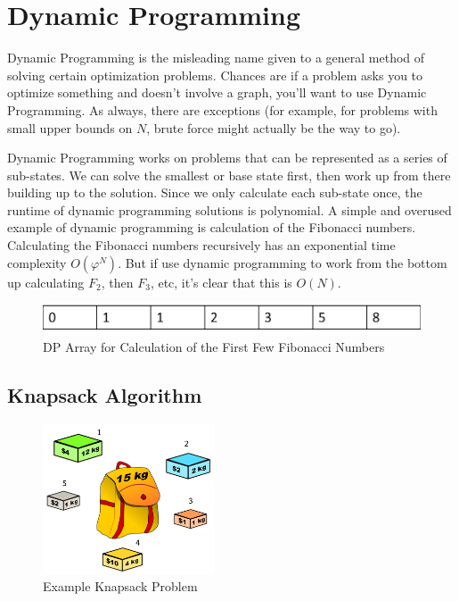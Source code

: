\chapter{Dynamic Programming}

Dynamic Programming is the misleading name given to a general method of solving certain optimization problems.  Chances are if a problem asks you to optimize something and doesn't involve a graph, you'll want to use Dynamic Programming.  As always, there are exceptions  (for example, for problems with small upper bounds on $N$, brute force might actually be the way to go).

Dynamic Programming works on problems that can be represented as a series of sub-states.  We can solve the smallest or base state first, then work up from there building up to the solution.  Since we only calculate each sub-state once, the runtime of dynamic programming solutions is polynomial.
%
A simple and overused example of dynamic programming is calculation of the Fibonacci numbers.  Calculating the Fibonacci numbers recursively has an exponential time complexity $O(\varphi^N)$.  But if use dynamic programming to work from the bottom up calculating $F_2$, then $F_3$, etc, it's clear that this is $O(N)$.
%
\begin{figure}[h]
\begin{center}
\includegraphics[width=6in]{images/fib-dp.png}
\end{center}
\caption{DP Array for Calculation of the First Few Fibonacci Numbers}
\end{figure}

\section{Knapsack Algorithm}

\begin{figure}[ht]
\begin{center}
\includegraphics[width=2in]{images/knapsack.png}
\end{center}
\caption{Example Knapsack Problem}
\label{fig:ihatelarry}
\end{figure}

